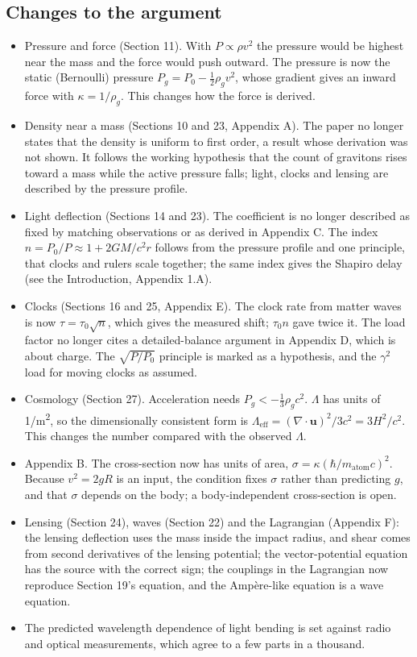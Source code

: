 \documentclass[12pt, a4paper]{article}
\begin{document}
\subsection*{Changes to the argument}
\begin{itemize}
  \item Pressure and force (Section 11). With \(P \propto \rho v^2\) the pressure would be highest near the mass and the force would push outward. The pressure is now the static (Bernoulli) pressure \(P_g = P_0 - \tfrac12\rho_g v^2\), whose gradient gives an inward force with \(\kappa = 1/\rho_g\). This changes how the force is derived.
  \item Density near a mass (Sections 10 and 23, Appendix A). The paper no longer states that the density is uniform to first order, a result whose derivation was not shown. It follows the working hypothesis that the count of gravitons rises toward a mass while the active pressure falls; light, clocks and lensing are described by the pressure profile.
  \item Light deflection (Sections 14 and 23). The coefficient is no longer described as fixed by matching observations or as derived in Appendix C. The index \(n = P_0/P \approx 1 + 2GM/c^2 r\) follows from the pressure profile and one principle, that clocks and rulers scale together; the same index gives the Shapiro delay (see the Introduction, Appendix 1.A).
  \item Clocks (Sections 16 and 25, Appendix E). The clock rate from matter waves is now \(\tau = \tau_0\sqrt{n}\), which gives the measured shift; \(\tau_0 n\) gave twice it. The load factor no longer cites a detailed-balance argument in Appendix D, which is about charge. The \(\sqrt{P/P_0}\) principle is marked as a hypothesis, and the \(\gamma^2\) load for moving clocks as assumed.
  \item Cosmology (Section 27). Acceleration needs \(P_g < -\tfrac13\rho_g c^2\). \(\Lambda\) has units of 1/m\textsuperscript{2}, so the dimensionally consistent form is \(\Lambda_{\text{eff}} = (\nabla\cdot\mathbf{u})^2/3c^2 = 3H^2/c^2\). This changes the number compared with the observed \(\Lambda\).
  \item Appendix B. The cross-section now has units of area, \(\sigma = \kappa(\hbar/m_{\text{atom}}c)^2\). Because \(v^2 = 2gR\) is an input, the condition fixes \(\sigma\) rather than predicting \(g\), and that \(\sigma\) depends on the body; a body-independent cross-section is open.
  \item Lensing (Section 24), waves (Section 22) and the Lagrangian (Appendix F): the lensing deflection uses the mass inside the impact radius, and shear comes from second derivatives of the lensing potential; the vector-potential equation has the source with the correct sign; the couplings in the Lagrangian now reproduce Section 19's equation, and the Amp\`ere-like equation is a wave equation.
  \item The predicted wavelength dependence of light bending is set against radio and optical measurements, which agree to a few parts in a thousand.
\end{itemize}
\end{document}
